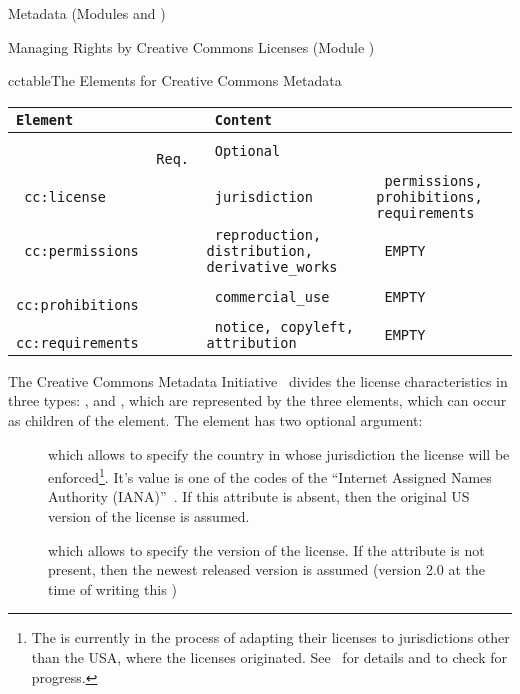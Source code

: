 \begin{tchapter}[id=metadata,short=Metadata]{Metadata (Modules {} and  {})}
\begin{tsection}[id=creativecommons,short=Managing Rights]{Managing Rights by Creative
    Commons Licenses (Module {})}
\begin{myfig}{cctable}{The {\omdoc} Elements for Creative Commons Metadata}
\begin{scriptsize}
\begin{tabular}{|>{\tt}l|>{\tt}l|>{\tt}p{}|>{\tt}l|}\hline
{\rm Element}& \multicolumn{2}{l|}{Attributes\hspace*{2.25cm}} & Content  \\\hline
             & {\rm Req.}  & {\rm Optional}    &          \\\hline\hline
 cc:license      & & jurisdiction    &  permissions, prohibitions, requirements  \\\hline
 cc:permissions  & & reproduction, distribution, derivative\_works & EMPTY\\\hline
 cc:prohibitions & & commercial\_use & EMPTY \\\hline
 cc:requirements & & notice, copyleft,  attribution & EMPTY \\\hline
\end{tabular}
\end{scriptsize}
\end{myfig}

The Creative Commons Metadata Initiative~\cite{creative-commons:on} divides the license
characteristics in three types: {}, {} and
{}, which are represented by the three elements, which can occur as
children of the {} element. The {}
element has two optional argument:
\begin{description}
\item[{}] which allows to specify the country
  in whose jurisdiction the license will be enforced\footnote{The {} is currently in the process of adapting their licenses to
    jurisdictions other than the USA, where the licenses
    originated. See~\cite{URL:creativecommonsWorldwide} for details and to check for
    progress.}. It's value is one of the {} codes of the
  ``Internet Assigned Names Authority (IANA)''~\cite{IANA:TLD}. If this attribute is
  absent, then the original US version of the license is assumed.
\item[{}] which allows to specify the version of the
  license. If the attribute is not present, then the newest released version is assumed
  (version 2.0 at the time of writing this {\report})
\end{description}


\end{tsection}
\end{tchapter}
